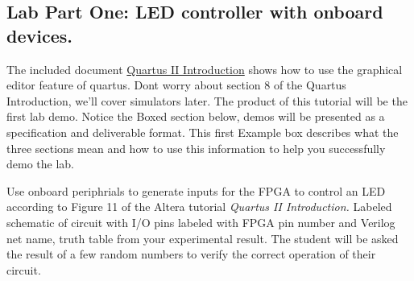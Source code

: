     \subsection{Lab Part One: LED controller with onboard devices.}
      The included document \href{ftp://ftp.altera.com/up/pub/Altera_Material/13.0/Tutorials/Schematic/Quartus_II_Introduction.pdf}{Quartus II Introduction} shows how to use the graphical editor feature of quartus. Dont worry about section 8 of the Quartus Introduction, we'll cover simulators later. The product of this tutorial will be the first lab demo. Notice the Boxed section below, demos will be presented as a specification and deliverable format. This first Example box describes what the three sections mean and how to use this information to help you successfully demo the lab.

          {Use onboard periphrials to generate inputs for the FPGA to control an LED according to Figure 11 of the Altera tutorial {\it Quartus II Introduction.}}
          {Labeled schematic of circuit with I/O pins labeled with FPGA pin number and Verilog net name,  truth table from your  experimental result.}
          {The student will be asked the result of a few random numbers to verify the correct operation of their circuit.}

